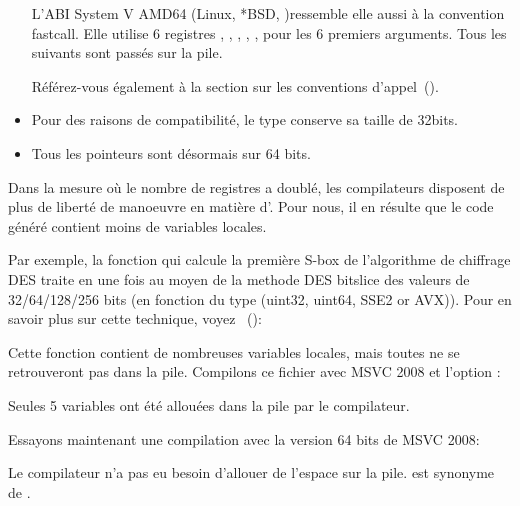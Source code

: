 \begin{itemize}
L'ABI System V AMD64 (Linux, *BSD, \MacOSX)\SysVABI ressemble elle aussi à la convention fastcall.
Elle utilise 6 registres \RDI, \RSI, \RDX, \RCX, ,  pour les 6 premiers arguments. 
Tous les suivants sont passés sur la pile.

Référez-vous également à la section sur les conventions d'appel~().

\item
Pour des raisons de compatibilité, le type \CCpp \Tint conserve sa taille de 32bits.

\item
Tous les pointeurs sont désormais sur 64 bits.

\end{itemize}


Dans la mesure où le nombre de registres a doublé, les compilateurs disposent de plus de liberté 
de manoeuvre en matière d'. 
Pour nous, il en résulte que le code généré contient moins de variables locales.


Par exemple, la fonction qui calcule la première S-box de l'algorithme de chiffrage DES traite 
en une fois au moyen de la methode DES bitslice des valeurs de 32/64/128/256 bits (en fonction 
du type  (uint32, uint64, SSE2 or AVX)).
Pour en savoir plus sur cette technique, voyez ~():



Cette fonction contient de nombreuses variables locales, mais toutes ne se retrouveront pas dans 
la pile. Compilons ce fichier avec MSVC 2008 et l'option :



Seules 5 variables ont été allouées dans la pile par le compilateur.

Essayons maintenant une compilation avec la version 64 bits de MSVC 2008:



Le compilateur n'a pas eu besoin d'allouer de l'espace sur la pile.  est synonyme de .

\iffalse

